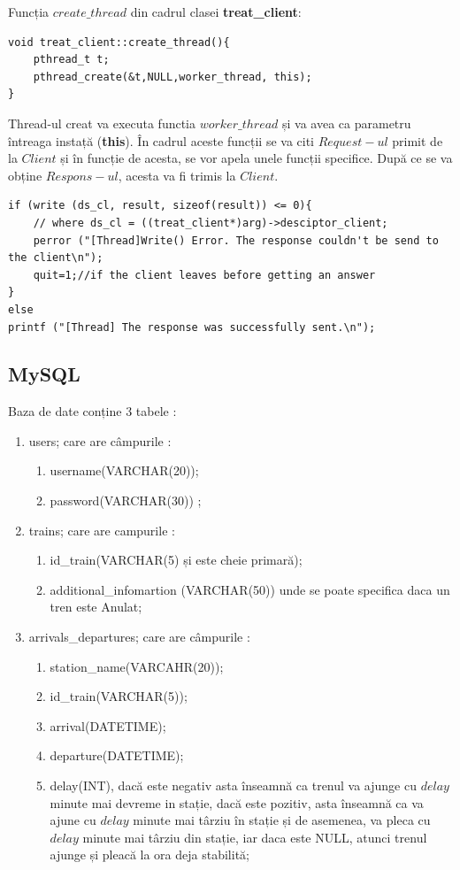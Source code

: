 \documentclass[runningheads]{llncs}
\begin{document}
Funcția $create\_thread$ din cadrul clasei \textbf{treat\_client}: 
\begin{verbatim}
void treat_client::create_thread(){			
    pthread_t t;
    pthread_create(&t,NULL,worker_thread, this);		
}
\end{verbatim}
	Thread-ul creat va executa functia $worker\_thread$ și va avea ca parametru 
	întreaga instață (\textbf{this}). În cadrul aceste funcții se va citi $Request-ul$ primit de la $Client$ și în funcție de acesta, se vor apela unele funcții specifice. După ce se va obține $Respons-ul$, acesta va fi trimis la $Client$.
	\begin{verbatim}
if (write (ds_cl, result, sizeof(result)) <= 0){
    // where ds_cl = ((treat_client*)arg)->desciptor_client;
    perror ("[Thread]Write() Error. The response couldn't be send to the client\n");
    quit=1;//if the client leaves before getting an answer
}
else
printf ("[Thread] The response was successfully sent.\n");
\end{verbatim}

\subsection{MySQL}
Baza de date conține 3 tabele :
\begin{enumerate}		
\itemsep0em
\item users; care are câmpurile :
\begin{enumerate}
\itemsep0em
\item username(VARCHAR(20));
\item password(VARCHAR(30)) ;
    \end{enumerate}
    \item trains; care are campurile : 
    \begin{enumerate}
	   \itemsep0em
	   \item id\_train(VARCHAR(5) și este cheie primară);
	   \item additional\_infomartion (VARCHAR(50)) unde se poate specifica daca un tren este Anulat;
    \end{enumerate}
\item arrivals\_departures; care are câmpurile :
\begin{enumerate}
        \itemsep0em
	\item station\_name(VARCAHR(20));
		\item id\_train(VARCHAR(5));
		\item arrival(DATETIME);
		\item departure(DATETIME);
		\item delay(INT), dacă este negativ asta înseamnă ca trenul va ajunge cu $delay$ minute mai devreme in stație, dacă este pozitiv, asta înseamnă ca va ajune cu $delay$ minute mai târziu în stație și de asemenea, va pleca cu $delay$ minute mai târziu din stație, iar daca este NULL, atunci trenul ajunge și pleacă la ora deja stabilită;
\end{enumerate}
\end{enumerate}
\end{document}
